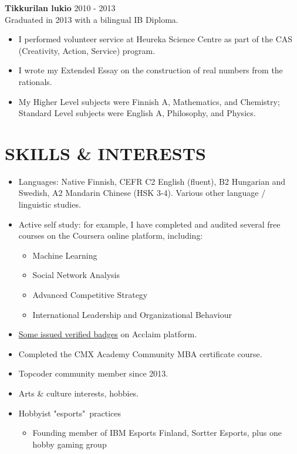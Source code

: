 \documentclass[margin, 10pt]{res} %
\begin{document}
\begin{resume}
\addvspace{-7pt}
\textbf{Tikkurilan lukio} \hfill 2010 - 2013\\
Graduated in 2013 with a bilingual IB Diploma.
\begin{itemize} \itemsep -2pt
\item I performed volunteer service at Heureka Science Centre as part of the CAS (Creativity, Action, Service) program.
\item I wrote my Extended Essay on the construction of real numbers from the rationals.
\item My Higher Level subjects were Finnish A, Mathematics, and Chemistry; Standard Level subjects were English A, Philosophy, and Physics. 
\end{itemize}



\section{SKILLS \& INTERESTS}
\begin{itemize} \itemsep -2pt
\item Languages: Native Finnish, CEFR C2 English (fluent), B2 Hungarian and Swedish, A2 Mandarin Chinese (HSK 3-4). Various other language / linguistic studies.
\item Active self study: for example, I have completed and audited several free courses on the Coursera online platform, including:
  \begin{itemize} \itemsep -2pt
  \item Machine Learning
  \item Social Network Analysis
  \item Advanced Competitive Strategy
  \item International Leadership and Organizational Behaviour
  \end{itemize}
\item \href{https://www.youracclaim.com/users/pentti-sunila/badges}{Some issued verified badges} on Acclaim platform.
\item Completed the CMX Academy Community MBA certificate course.
\item Topcoder community member since 2013.
\item Arts \& culture interests, hobbies.
\item Hobbyist "esports"\ practices
\begin{itemize}
	\item Founding member of IBM Esports Finland, Sortter Esports, plus one hobby  gaming group

\end{itemize}
\end{itemize}
\end{resume}
\end{document}
